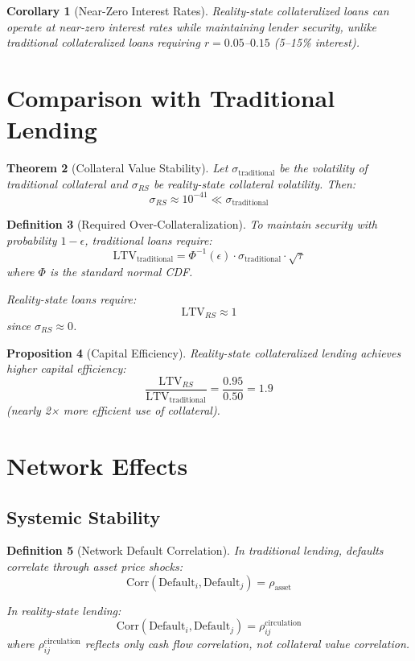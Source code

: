 \documentclass[12pt]{article}
\newtheorem{theorem}{Theorem}
\newtheorem{definition}[theorem]{Definition}
\newtheorem{proposition}[theorem]{Proposition}
\newtheorem{corollary}[theorem]{Corollary}
\begin{document}
\begin{corollary}[Near-Zero Interest Rates]
Reality-state collateralized loans can operate at near-zero interest rates while maintaining lender security, unlike traditional collateralized loans requiring $r = 0.05$--$0.15$ (5--15\% interest).
\end{corollary}

\section{Comparison with Traditional Lending}

\begin{theorem}[Collateral Value Stability]
Let $\sigma_{\text{traditional}}$ be the volatility of traditional collateral and $\sigma_{RS}$ be reality-state collateral volatility. Then:
$$
\sigma_{RS} \approx 10^{-41} \ll \sigma_{\text{traditional}}
$$
\end{theorem}

\begin{definition}[Required Over-Collateralization]
To maintain security with probability $1-\epsilon$, traditional loans require:
$$
\text{LTV}_{\text{traditional}} = \Phi^{-1}(\epsilon) \cdot \sigma_{\text{traditional}} \cdot \sqrt{\tau}
$$
where $\Phi$ is the standard normal CDF.

Reality-state loans require:
$$
\text{LTV}_{RS} \approx 1
$$
since $\sigma_{RS} \approx 0$.
\end{definition}

\begin{proposition}[Capital Efficiency]
Reality-state collateralized lending achieves higher capital efficiency:
$$
\frac{\text{LTV}_{RS}}{\text{LTV}_{\text{traditional}}} = \frac{0.95}{0.50} = 1.9
$$
(nearly 2× more efficient use of collateral).
\end{proposition}

\section{Network Effects}

\subsection{Systemic Stability}

\begin{definition}[Network Default Correlation]
In traditional lending, defaults correlate through asset price shocks:
$$
\text{Corr}(\text{Default}_i, \text{Default}_j) = \rho_{\text{asset}}
$$

In reality-state lending:
$$
\text{Corr}(\text{Default}_i, \text{Default}_j) = \rho_{ij}^{\text{circulation}}
$$
where $\rho_{ij}^{\text{circulation}}$ reflects only cash flow correlation, not collateral value correlation.
\end{definition}
\end{document}

